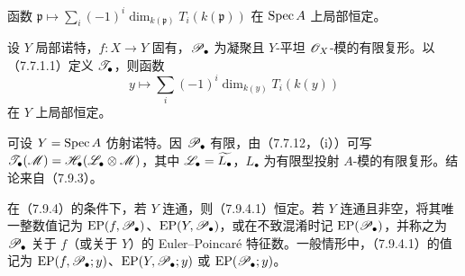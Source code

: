 函数 $\mathfrak p\mapsto\sum_i(-1)^i\dim_{k(\mathfrak p)}T_i(k(\mathfrak p))$ 在 $\operatorname{Spec} A$ 上局部恒定。

设 $Y$ 局部诺特，$f:X\to Y$ 固有，$\mathscr P_\bullet$ 为凝聚且 $Y$-平坦 $\mathscr O_X$-模的有限复形。以（7.7.1.1）定义 $\mathscr T_\bullet$，则函数
\begin{equation}
 y\longmapsto\sum_i(-1)^i\dim_{k(y)}T_i(k(y))\tag{7.9.4.1}
\end{equation}
在 $Y$ 上局部恒定。

可设 $Y=\operatorname{Spec} A$ 仿射诺特。因 $\mathscr P_\bullet$ 有限，由（7.7.12，（i））可写 $\mathscr T_\bullet(\mathscr M)=\mathscr H_\bullet(\mathscr L_\bullet\otimes\mathscr M)$，其中 $\mathscr L_\bullet=\widetilde{L_\bullet}$，$L_\bullet$ 为有限型投射 $A$-模的有限复形。结论来自（7.9.3）。

在（7.9.4）的条件下，若 $Y$ 连通，则（7.9.4.1）恒定。若 $Y$ 连通且非空，将其唯一整数值记为 $\operatorname{EP}(f,\mathscr P_\bullet)$、$\operatorname{EP}(Y,\mathscr P_\bullet)$，或在不致混淆时记 $\operatorname{EP}(\mathscr P_\bullet)$，并称之为 $\mathscr P_\bullet$ 关于 $f$（或关于 $Y$）的 Euler--Poincaré 特征数。一般情形中，（7.9.4.1）的值记为 $\operatorname{EP}(f,\mathscr P_\bullet;y)$、$\operatorname{EP}(Y,\mathscr P_\bullet;y)$ 或 $\operatorname{EP}(\mathscr P_\bullet;y)$。

